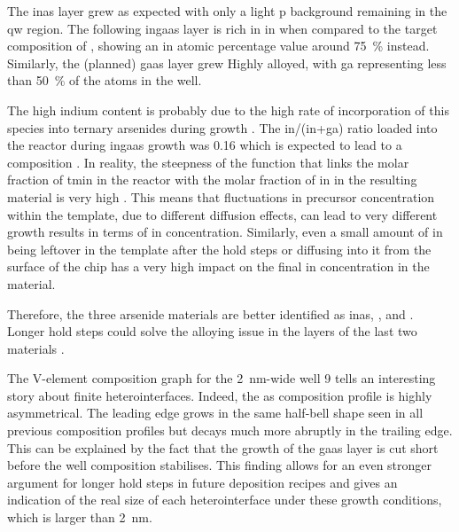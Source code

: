 The \acs{inas} layer grew as expected with only a light \acl{p} background remaining in the \acl{qw} region. The following \acs{ingaas} layer is rich in \acl{in} when compared to the target composition of , showing an \acl{in} atomic percentage value around \qty{75}{\%} instead. Similarly, the (planned) \acs{gaas} layer grew Highly alloyed, with \acl{ga} representing less than \qty{50}{\%} of the atoms in the well. 

The high indium content is probably due to the high rate of incorporation of this species into ternary arsenides during  growth \cite{Borg2019}. The \acs{in}/(\acs{in}+\acs{ga}) ratio loaded into the reactor during \acs{ingaas} growth was \num{0.16} which is expected to lead to a  composition \cite{Borg2019}. In reality, the steepness of the function that links the molar fraction of \acf{tmin} in the reactor with the molar fraction of \acl{in} in the resulting material is very high \cite{Borg2019}. This means that fluctuations in precursor concentration within the template, due to different diffusion effects, can lead to very different growth results in terms of \acl{in} concentration. Similarly, even a small amount of \acl{in} being leftover in the template after the hold steps or diffusing into it from the surface of the chip has a very high impact on the final \acl{in} concentration in the material. 

Therefore, the three arsenide materials are better identified as \acs{inas}, , and . Longer hold steps could solve the alloying issue in the layers of the last two materials \cite{Brugnolotto2023_2}.

The V-element composition graph for the \qty{2}{\nano\metre}-wide well 9 tells an interesting story about finite heterointerfaces. Indeed, the \acl{as} composition profile is highly asymmetrical. The leading edge grows in the same half-bell shape seen in all previous composition profiles but decays much more abruptly in the trailing edge. This can be explained by the fact that the growth of the \acs{gaas} layer is cut short before the well composition stabilises. This finding allows for an even stronger argument for longer hold steps in future deposition recipes and gives an indication of the real size of each heterointerface under these growth conditions, which is larger than \qty{2}{\nano\metre}.
\par

